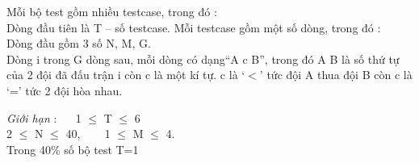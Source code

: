 Mỗi bộ test gồm nhiều testcase, trong đó :   \textbf{
\\}   Dòng đầu tiên là T – số testcase. Mỗi testcase gồm một số dòng, trong đó :   
\\   Dòng đầu gồm 3 số N, M, G.   
\\   Dòng i trong G dòng sau, mỗi dòng có dạng“A c B”, trong đó A B là số thứ tự của 2 đội đã đấu trận i còn c là một kí tự. c là ‘$<$’ tức đội A thua đội B còn c là ‘=’ tức 2 đội hòa nhau.  

\emph{    Giới hạn   }   :    1 $\le$  T  $\le$  6   
\\   2  $\le$  N  $\le$  40,     1  $\le$  M  $\le$  4.   
\\   Trong 40\% số bộ test T=1